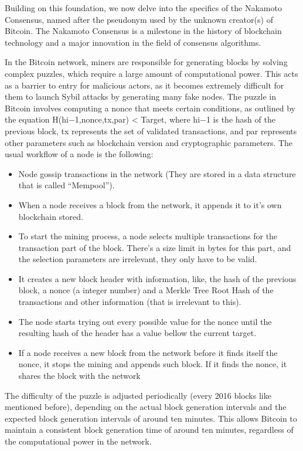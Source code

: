 Building on this foundation, we now delve into the specifics of the Nakamoto Consensus, named after the pseudonym used by the unknown creator(s) of Bitcoin. The Nakamoto Consensus is a milestone in the history of blockchain technology and a major innovation in the field of consensus algorithms.

In the Bitcoin network, miners are responsible for generating blocks by solving complex puzzles, which require a large amount of computational power.
This acts as a barrier to entry for malicious actors, as it becomes extremely difficult for them to launch Sybil attacks by generating many fake nodes.
The puzzle in Bitcoin involves computing a nonce that meets certain conditions, as outlined by the equation H(hi−1,nonce,tx,par) < Target, where hi−1 is the hash of the previous block, tx represents the set of validated transactions, and par represents other parameters such as blockchain version and cryptographic parameters.
The usual workflow of a node is the following:
\begin{itemize}
    \item Node gossip transactions in the network (They are stored in a data structure that is called ``Mempool'').
    \item When a node receives a block from the network, it appends it to it's own blockchain stored.
    \item To start the mining process, a node selects multiple transactions for the transaction part of the block. There's a size limit in bytes for this part, and the selection parameters are irrelevant, they only have to be valid.
    \item It creates a new block header with information, like, the hash of the previous block, a nonce (a integer number) and a Merkle Tree Root Hash of the transactions and other information (that is irrelevant to this).
    \item The node starts trying out every possible value for the nonce until the resulting hash of the header has a value bellow the current target.
    \item If a node receives a new block from the network before it finds itself the nonce, it stops the mining and appends such block. If it finds the nonce, it shares the block with the network
    
\end{itemize}

The difficulty of the puzzle is adjusted periodically (every 2016 blocks like mentioned before), depending on the actual block generation intervals and the expected block generation intervals of around ten minutes. This allows Bitcoin to maintain a consistent block generation time of around ten minutes, regardless of the computational power in the network.

